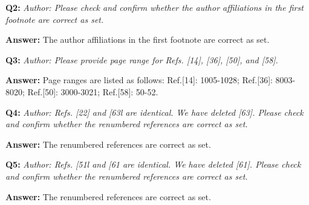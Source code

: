 \documentclass{article}
\begin{document}
\textbf{Q2:}
\emph{Author: Please check and confirm whether the author affiliations in the first footnote are correct as set.}

\textbf{Answer:} 
The author affiliations in the first footnote are correct as set.

\textbf{Q3:}
\emph{Author: Please provide page range for Refs. [14], [36], [50], and [58].}

\textbf{Answer:} 
Page ranges are listed as follows:  
Ref.[14]: 1005-1028; Ref.[36]: 8003-8020; Ref.[50]: 3000-3021; Ref.[58]: 50-52.

\textbf{Q4:}
\emph{Author: Refs. [22] and [63l are identical. We have deleted [63]. Please check and confirm whether the renumbered references are correct as set.}

\textbf{Answer:} 
The renumbered references are correct as set.

\textbf{Q5:}
\emph{Author: Refs. [51l and [61 are identical. We have deleted [61]. Please check and confirm whether the renumbered references are correct as set.}

\textbf{Answer:} 
The renumbered references are correct as set.



\end{document}
